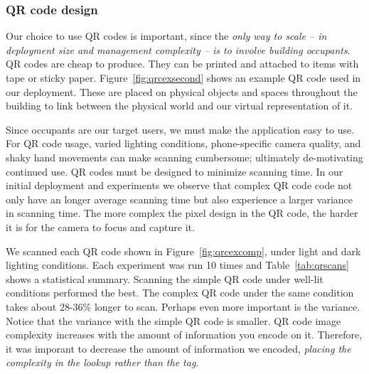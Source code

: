 \subsubsection{QR code design}
\label{sec:qrc}
Our choice to use QR codes is important, since the \emph{only way to scale -- in deployment size and management complexity -- is to
involve building occupants}. QR codes are cheap to produce.  They can be printed and attached to items with tape or sticky paper.  
Figure~\ref{fig:qrcexsecond} shows an example QR code used in our deployment.  These are placed on physical
objects and spaces throughout the building to link between the physical world and our virtual representation of it.


Since occupants are our target users, we must make the application easy to use.  For QR code usage, varied lighting conditions, 
phone-specific camera quality, and shaky hand movements can make scanning cumbersome; ultimately de-motivating continued use.  
QR codes must be designed to minimize scanning time.  In our initial deployment and experiments we observe
that complex QR code code not only have an longer average scanning time but also experience a larger variance in scanning time.  
The more complex the pixel design in the QR code, the harder it is for the camera to focus and capture it. 


We scanned each QR code shown in Figure~\ref{fig:qrcexcomp}, under light and dark lighting conditions.  
Each experiment was run 10 times and Table~\ref{tab:qrscans} shows a statistical summary.  Scanning the simple QR code under well-lit 
conditions performed the best.  The complex QR code under  the same condition takes about 28-36\% longer to scan.
Perhaps even more important is the variance.  Notice that the variance with the simple QR code is smaller.
QR code image complexity increases with the amount of information you encode on it.  Therefore, it was imporant to decrease the
amount of information we encoded, \emph{placing the complexity in the lookup rather than the tag.}

